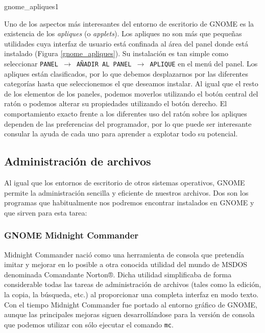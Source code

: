 \begin{figura}{gnome_apliques}{1}
\caption{Ejemplos de paneles con apliques}
\label{gnome_apliques}
\end{figura}

Uno de los aspectos más interesantes del entorno de escritorio de {\sf
GNOME} es la existencia de los {\em apliques} (o
{\em  applets}).  Los  apliques no  son  más  que
pequeñas utilidades  cuya interfaz de  usuario está confinada  al área
del  panel  donde  está instalado  (Figura  \ref{gnome_apliques}).  Su
instalación es  tan simple  como seleccionar {\tt  PANEL $\rightarrow$
AÑADIR  AL PANEL  $\rightarrow$ APLIQUE}  en  el menú  del panel.  Los
apliques  están  clasificados, por  lo  que  debemos desplazarnos  por
las  diferentes categorías  hasta  que seleccionemos  el que  deseamos
instalar.  Al igual  que el  resto de  los elementos  de los  paneles,
podemos  moverlos utilizando  el  botón central  del  ratón o  podemos
alterar su propiedades utilizando  el botón derecho. El comportamiento
exacto  frente a  los  diferentes  uso del  ratón  sobre los  apliques
dependen de  las preferencias  del programador, por  lo que  puede ser
interesante consular  la ayuda  de cada uno  para aprender  a explotar
todo su potencial.

\subsection{Administración de archivos}

Al igual que los entornos  de escritorio de otros sistemas operativos,
{\sf GNOME} permite la administración sencilla y eficiente de nuestros
archivos.  Dos  son  los  programas  que  habitualmente  nos  podremos
encontrar instalados en {\sf GNOME} y que sirven para esta tarea:

\subsubsection{GNOME Midnight Commander}

{\sf Midnight  Commander} nació  como una  herramienta de  consola que
pretendía imitar y mejorar en lo  posible a otra conocida utilidad del
mundo  de MSDOS  denominada {\sf  Comandante Norton®}.  Dicha utilidad
simplificaba de forma considerable  todas las tareas de administración
de archivos  (tales como la edición,  la copia, la búsqueda,  etc.) al
proporcionar una completa  interfaz en modo texto. Con  el tiempo {\sf
Midnight Commander}  fue portado  al entorno  gráfico de  {\sf GNOME},
aunque las principales mejoras  siguen desarrollándose para la versión
de consola que podemos utilizar con sólo ejecutar el comando {\tt mc}.

